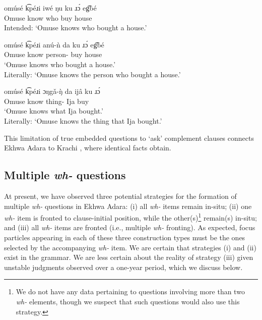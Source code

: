 \documentclass[output=paper,colorlinks,citecolor=brown
]{langscibook}
\begin{document}
\ea \label{ex:matte:19}
\begin{xlist}

\ex \label{ex:matte:19a}
\gll * omúsé k͡péɹi iwé ŋu ku ɹɔ́ eg͡bé\\
{} Omuse know who \Foc{} \Pfv{} buy house\\
\glt Intended: `Omuse knows who bought a house.'

\ex \label{ex:matte:19b}
\gll omúsé k͡péɹi anú-ǹ da ku ɹɔ́ eg͡bé\\
Omuse know person-\Def{} \Rel{} \Pfv{} buy house\\
\glt `Omuse knows who bought a house.'\\
Literally: `Omuse knows the person who bought a house.'

\ex \label{ex:matte:19c}
\gll omúsé k͡péɹi ɔŋgǎ-ŋ̀ da ijâ ku ɹɔ́\\
Omuse know thing-\Def{} \Rel{} Ija \Pfv{} buy\\
\glt `Omuse knows what Ija bought.'\\
Literally: `Omuse knows the thing that Ija bought.'

\end{xlist}
\z

\noindent This limitation of true embedded questions to `ask' complement clauses connects Ekhwa Adara to Krachi \citep{TorrenceKandybowicz2015}, where identical facts obtain.

\subsection{Multiple \textit{wh-} questions} \label{sec:matte:3.4}

At present, we have observed three potential strategies for the formation of multiple \textit{wh-} questions in Ekhwa Adara: (i) all \textit{wh-} items remain in-situ; (ii) one \textit{wh-} item is fronted to clause-initial position, while the other(s)\footnote{We do not have any data pertaining to questions involving more than two \textit{wh-} elements, though we suspect that such questions would also use this strategy.} remain(s) in-situ; and (iii) all \textit{wh-} items are fronted (i.e., multiple \textit{wh-} fronting). As expected, focus particles appearing in each of these three construction types must be the ones selected by the accompanying \textit{wh-} item. We are certain that strategies (i) and (ii) exist in the grammar. We are less certain about the reality of strategy (iii) given unstable judgments observed over a one-year period, which we discuss below. 
\end{document}
